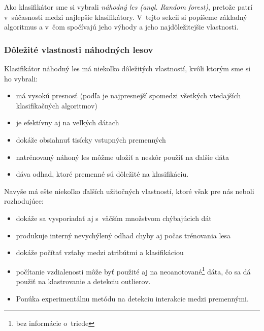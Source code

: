 

Ako klasifikátor sme si vybrali \textit{náhodný les (angl. Random forest)}, pretože patrí v~súčasnosti medzi najlepšie klasifikátory. V~tejto sekcii si popíšeme základný algoritmus a v~čom spočívajú jeho výhody a jeho najdôležitejšie vlastnosti.

\subsubsection[Dôležité vlastnosti]{Dôležité vlastnosti náhodných lesov}
Klasifikátor náhodný les má niekoľko dôležitých vlastností, kvôli ktorým sme si ho vybrali:
\begin{itemize}
\item má vysokú presnosť (podľa \cite{randomForest} je najpresnejší spomedzi všetkých vtedajších klasifikačných algoritmov)
\item je efektívny aj na veľkých dátach
\item dokáže obsiahnuť tisícky vstupných premenných
\item natrénovaný náhoný les môžme uložiť a neskôr použiť na ďalšie dáta
\item dáva odhad, ktoré premenné sú dôležité na klasifikáciu.
\end{itemize}

Navyše má ešte niekoľko ďalších užitočných vlastností, ktoré však pre nás neboli rozhodujúce:

\begin{itemize}
\item dokáže sa vysporiadať aj s~väčším množstvom chýbajúcich dát
\item produkuje interný nevychýlený odhad chyby aj počas trénovania lesa
\item dokáže počítať vzťahy medzi atribútmi a klasifikáciou
\item počítanie vzdialenosti môže byť použité aj na neoanotované\footnote{bez informácie o~triede} dáta, čo sa dá použiť na klastrovanie a detekciu outlierov.
\item Ponúka experimentálnu metódu na detekciu interakcie medzi premennými.
\end{itemize}

